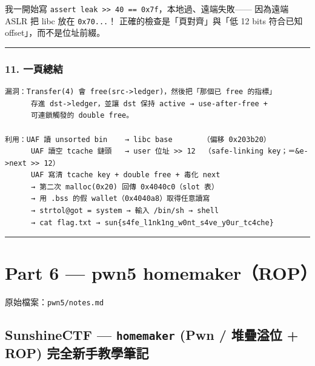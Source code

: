 \documentclass[10pt,a4paper]{article}
\renewenvironment{quote}{%
  \begin{mdframed}[linewidth=0pt,innerleftmargin=0pt,innerrightmargin=0pt,
    innerbottommargin=0pt,innertopmargin=0pt,skipabove=0.55em,skipbelow=0.55em,
    leftmargin=0.9em,rightmargin=0.4em,startcode={\color{quotebar}\vrule width 2.6pt},%
    endcode={}]%
  \itshape\color{black}%
}{%
  \end{mdframed}%
}
\begin{document}
我一開始寫
\texttt{assert\ \allowbreak{}leak\ \allowbreak{}\textgreater{}\allowbreak{}\textgreater{}\allowbreak{}\ \allowbreak{}40\ \allowbreak{}==\ \allowbreak{}0x7f}，本地過、遠端失敗------
因為遠端 ASLR 把 libc 放在 \texttt{0x70...}！
正確的檢查是「頁對齊」與「低 12 bits 符合已知 offset」，而不是位址前綴。

\begin{center}\rule{0.5\linewidth}{0.5pt}\end{center}

\subsubsection{11. 一頁總結}\label{ux4e00ux9801ux7e3dux7d50}

\begin{Verbatim}[breaklines=true,breakanywhere=true,breakautoindent=false,fontsize=\fontsize{7.0}{9.5}\selectfont]
漏洞：Transfer(4) 會 free(src->ledger)，然後把「那個已 free 的指標」
      存進 dst->ledger，並讓 dst 保持 active → use-after-free +
      可連鎖觸發的 double free。

利用：UAF 讀 unsorted bin    → libc base       （偏移 0x203b20）
      UAF 讀空 tcache 鏈頭   → user 位址 >> 12  （safe-linking key；＝&e->next >> 12）
      UAF 寫清 tcache key + double free + 毒化 next
      → 第二次 malloc(0x20) 回傳 0x4040c0（slot 表）
      → 用 .bss 的假 wallet（0x4040a8）取得任意讀寫
      → strtol@got = system → 輸入 /bin/sh → shell
      → cat flag.txt → sun{s4fe_l1nk1ng_w0nt_s4ve_y0ur_tc4che}
\end{Verbatim}

\begin{center}\rule{0.5\linewidth}{0.5pt}\end{center}

\section{Part 6 --- pwn5
homemaker（ROP）}\label{part-6-pwn5-homemakerrop}

\begin{quote}
原始檔案：\texttt{pwn5/\allowbreak{}notes.\allowbreak{}md}
\end{quote}

\subsection{\texorpdfstring{SunshineCTF --- \texttt{homemaker} (Pwn /
堆疊溢位 + ROP)
完全新手教學筆記}{SunshineCTF --- homemaker (Pwn / 堆疊溢位 + ROP) 完全新手教學筆記}}\label{sunshinectf-homemaker-pwn-ux5806ux758aux6ea2ux4f4d-rop-ux5b8cux5168ux65b0ux624bux6559ux5b78ux7b46ux8a18}
\end{document}
